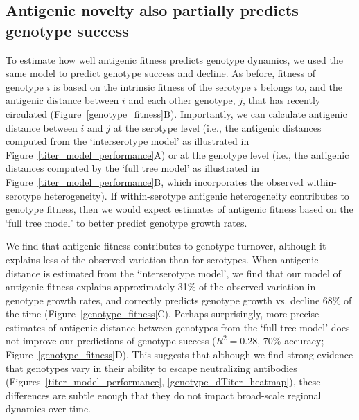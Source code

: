 \documentclass[11pt,oneside,letterpaper]{article}
\begin{document}
\subsection*{Antigenic novelty also partially predicts genotype success}
To estimate how well antigenic fitness predicts genotype dynamics, we used the same model to predict genotype success and decline.
As before, fitness of genotype $i$ is based on the intrinsic fitness of the serotype $i$ belongs to, and the antigenic distance between $i$ and each other genotype, $j$, that has recently circulated (Figure~\ref{genotype_fitness}B).
Importantly, we can calculate antigenic distance between $i$ and $j$ at the serotype level (i.e., the antigenic distances computed from the `interserotype model' as illustrated in Figure~\ref{titer_model_performance}A) or at the genotype level (i.e., the antigenic distances computed by the `full tree model' as illustrated in Figure~\ref{titer_model_performance}B, which incorporates the observed within-serotype heterogeneity).
If within-serotype antigenic heterogeneity contributes to genotype fitness, then we would expect estimates of antigenic fitness based on the `full tree model' to better predict genotype growth rates.

We find that antigenic fitness contributes to genotype turnover, although it explains less of the observed variation than for serotypes.
When antigenic distance is estimated from the `interserotype model', we find that our model of antigenic fitness explains approximately 31\% of the observed variation in genotype growth rates, and correctly predicts genotype growth vs. decline 68\% of the time (Figure~\ref{genotype_fitness}C).
Perhaps surprisingly, more precise estimates of antigenic distance between genotypes from the `full tree model' does not improve our predictions of genotype success ($R^2 = 0.28$, 70\% accuracy; Figure~\ref{genotype_fitness}D).
This suggests that although we find strong evidence that genotypes vary in their ability to escape neutralizing antibodies (Figures~\ref{titer_model_performance}, \ref{genotype_dTiter_heatmap}), these differences are subtle enough that they do not impact broad-scale regional dynamics over time.
\end{document}
